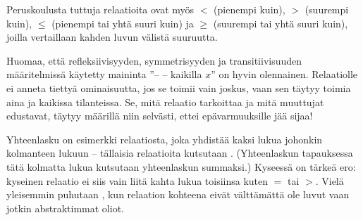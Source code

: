 Peruskoulusta tuttuja relaatioita ovat myös $<$ (pienempi kuin), $>$ (suurempi kuin), $\leq$ (pienempi tai yhtä suuri kuin) ja $\geq$ (suurempi tai yhtä suuri kuin), joilla vertaillaan kahden luvun välistä suuruutta.

\begin{esimerkki}
\end{esimerkki}

Huomaa, että refleksiivisyyden, symmetrisyyden ja transitiivisuuden määritelmissä käytetty maininta ''-- -- kaikilla $x$'' on hyvin olennainen. Relaatiolle ei anneta tiettyä ominaisuutta, jos se toimii vain joskus, vaan sen täytyy toimia aina ja kaikissa tilanteissa. Se, mitä relaatio tarkoittaa ja mitä muuttujat edustavat, täytyy määrillä niin selvästi, ettei epävarmuuksille jää sijaa!

Yhteenlasku on esimerkki relaatiosta, joka yhdistää kaksi lukua johonkin kolmanteen lukuun -- tällaisia relaatioita kutsutaan . (Yhteenlaskun tapauksessa tätä kolmatta lukua kutsutaan yhteenlaskun summaksi.) Kyseessä on tärkeä ero: kyseinen relaatio ei siis vain liitä kahta lukua toisiinsa kuten $=$ tai $>$. Vielä yleisemmin puhutaan , kun relaation kohteena eivät välttämättä ole luvut vaan jotkin abstraktimmat oliot.